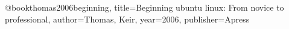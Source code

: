 @book{thomas2006beginning,
  title={Beginning ubuntu linux: From novice to professional},
  author={Thomas, Keir},
  year={2006},
  publisher={Apress}
}